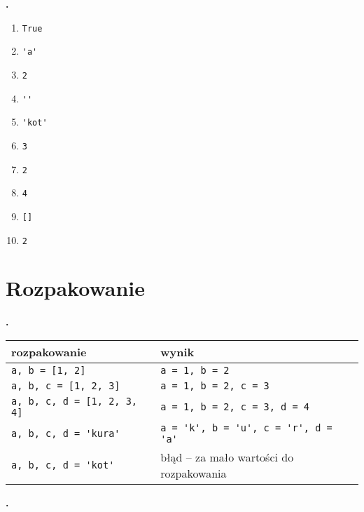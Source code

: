 \documentclass[a4paper]{article}
\begin{document}
\textbf{.}\addtocounter{zadanie}{1}

\begin{multicols}{2}
\begin{enumerate}[label=\arabic*.]
    \item \verb|True|
    \item \verb|'a'|
    \item \verb|2|
    \item \verb|''|
    \item \verb|'kot'|
    \item \verb|3|
    \item \verb|2|
    \item \verb|4|
    \item \verb|[]|
    \item \verb|2|

\end{enumerate}

\end{multicols}

\section{Rozpakowanie}

\textbf{.}\addtocounter{zadanie}{1}

\begin{tabular}{p{}|p{}}
\textsf{rozpakowanie} & \textsf{wynik} \\\hline
\verb|a, b = [1, 2]| & \verb|a = 1, b = 2|\\
\verb|a, b, c = [1, 2, 3]| & \verb|a = 1, b = 2, c = 3|\\
\verb|a, b, c, d = [1, 2, 3, 4]| & \verb|a = 1, b = 2, c = 3, d = 4| \\
\verb|a, b, c, d = 'kura'| & \verb|a = 'k', b = 'u', c = 'r', d = 'a'| \\
\verb|a, b, c, d = 'kot'| & błąd -- za mało wartości do rozpakowania \\

\end{tabular}

\textbf{.}\addtocounter{zadanie}{1}
\end{document}
